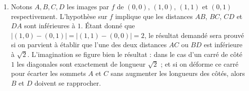 \begin{enumerate}
\item 
Notons $A,B,C,D$ les images par $f$ de $(0,0)$, $(1,0)$, $(1,1)$ et $(0,1)$ respectivement. L'hypothèse sur $f$ implique que les distances $AB$, $BC$, $CD$ et $DA$ sont inférieures à $1$. Étant donné que $\lvert(1,0) - (0,1)\rvert = \lvert(1,1) - (0,0)\rvert = 2$, le résultat demandé sera prouvé si on parvient à établir que l'une des deux distances $AC$ ou $BD$ est inférieure à $\sqrt 2$. L'imagination se figure bien le résultat : dans le cas d'un carré de côté $1$ les diagonales sont exactement de longueur $\sqrt 2$ ; et si on déforme ce carré pour écarter les sommets $A$ et $C$ sans augmenter les longueurs des côtés, alors $B$ et $D$ doivent se rapprocher.

\begin{center}
\end{center}
\end{enumerate}
